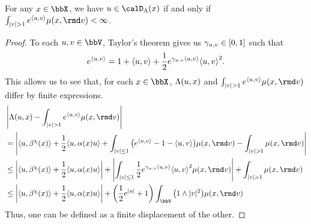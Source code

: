 \begin{lemma}
  \label{lemma:odeSpace-rationale}
  For any $\stateVar \in \stateSpace$, we have $\momentVar \in \odeSpace(\stateVar)$ if and only if 
  $\int_{|\vecVar|>1} e^\prj{\momentVar}{\vecVar} \affJump(\stateVar, \rmd\markVar) < \infty$.
\end{lemma}
\begin{proof}
  \label{proof:lemma:odeSpace-rationale}
  To each $\momentVar, \vecVar \in \vecSpace$, Taylor's theorem gives us $\gamma_{u,v} \in [0,1]$ such that
  \begin{equation*}
    e^{\langle u , v \rangle} = 1 + {\langle u , v \rangle} + \frac12 e^{\gamma_{u,v} {\langle u , v \rangle}} {\langle u , v \rangle}^2.
  \end{equation*}
  This allows us to see that, for each $\stateVar \in \stateSpace$, $\Lambda(u,x)$ and $\int_{|\markVar|>1} e^\prj{\momentVar}{\markVar} \affJump(\stateVar,\rmd\markVar)$ differ by finite expressions.
  \begin{align*}
    &\left|\ode(\momentVar, \stateVar) - \int_{|\markVar|>1} e^\prj{\momentVar}{\vecVar} \affJump(\stateVar, \rmd\markVar) \right| \tag*{} \\
    &= \left|\prj{\momentVar}{\affDrift^\trunc(\stateVar)} + \frac12\prj{\momentVar}{\affDiff(\stateVar)\momentVar} + \int_{|\vecVar|\leq 1} \big( e^\prj{\momentVar}{\vecVar} - 1 - \prj{\momentVar}{\vecVar} \big) \affJump(\stateVar,\rmd\markVar) - \int_{|\vecVar|>1} \affJump(\stateVar,\rmd\markVar) \right| \\
    &\leq \left|\prj{\momentVar}{\affDrift^\trunc(\stateVar)} + \frac12\prj{\momentVar}{\affDiff(\stateVar)\momentVar} \right| + \left| \int_{|\markVar|\leq1} \frac12 e^{\gamma_{\momentVar,\markVar}\prj{\momentVar}{\markVar}} \prj{\momentVar}{\markVar}^2 \affJump(\stateVar,\rmd\markVar)\right| + \int_{|\markVar|>1} \affJump(\stateVar,\rmd\markVar) \\
    &\leq \left|\prj{\momentVar}{\affDrift^\trunc(\stateVar)} + \frac12\prj{\momentVar}{\affDiff(\stateVar)\momentVar} \right| + \left( \frac12 e^{|\momentVar|} + 1 \right) \int_\vecSpace \big(1 \wedge |\markVar|^2\big) \affJump(\stateVar, \rmd\markVar)
  \end{align*}
  Thus, one can be defined as a finite displacement of the other.
\end{proof}
